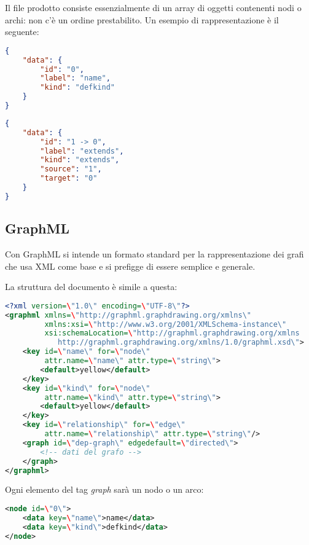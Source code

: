 Il file prodotto consiste essenzialmente di un array di oggetti contenenti nodi o archi: non c'\`e un ordine prestabilito. Un esempio di rappresentazione \`e il seguente:

\begin{lstlisting}[language=JSON, caption=esempio di nodo]
{
    "data": {
        "id": "0",
        "label": "name",
        "kind": "defkind"
    }
}
\end{lstlisting}

\begin{lstlisting}[language=JSON, caption=esempio di arco]
{
    "data": {
        "id": "1 -> 0",
        "label": "extends",
        "kind": "extends",
        "source": "1",
        "target": "0"
    }
}
\end{lstlisting}

\subsection{GraphML}

Con GraphML \cite{GraphML} si intende un formato standard per la rappresentazione dei grafi che usa XML come base e si prefigge di essere semplice e generale.

La struttura del documento \`e simile a questa:

\begin{lstlisting}[language=XML, caption=file GraphML]
<?xml version=\"1.0\" encoding=\"UTF-8\"?>
<graphml xmlns=\"http://graphml.graphdrawing.org/xmlns\"
         xmlns:xsi=\"http://www.w3.org/2001/XMLSchema-instance\"
         xsi:schemaLocation=\"http://graphml.graphdrawing.org/xmlns
            http://graphml.graphdrawing.org/xmlns/1.0/graphml.xsd\">
    <key id=\"name\" for=\"node\"
         attr.name=\"name\" attr.type=\"string\">
        <default>yellow</default>
    </key>
    <key id=\"kind\" for=\"node\"
         attr.name=\"kind\" attr.type=\"string\">
        <default>yellow</default>
    </key>
    <key id=\"relationship\" for=\"edge\"
         attr.name=\"relationship\" attr.type=\"string\"/>
    <graph id=\"dep-graph\" edgedefault=\"directed\">
        <!-- dati del grafo -->
    </graph>
</graphml>
\end{lstlisting}

Ogni elemento del tag \emph{graph} sar\`a un nodo o un arco:

\begin{lstlisting}[language=XML, caption=esempio di nodo]
<node id=\"0\">
    <data key=\"name\">name</data>
    <data key=\"kind\">defkind</data>
</node>
\end{lstlisting}

